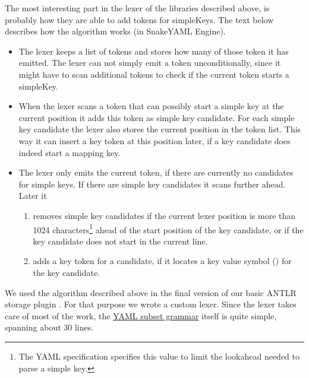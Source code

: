 The most interesting part in the lexer of the libraries described above, is probably how they are able to add \glspl{token} for \glspl{simpleKey}. The text below describes how the algorithm works (in SnakeYAML Engine).

\begin{itemize}

  \item The lexer keeps a list of \glspl{token} and stores how many of those \gls{token} it has emitted. The lexer can not simply emit a \gls{token} unconditionally, since it might have to scan additional \glspl{token} to check if the current \gls{token} starts a \gls{simpleKey}.

  \item When the lexer scans a  \gls{token} that can possibly start a simple key at the current position it adds this \gls{token} as simple key candidate. For each simple key candidate the lexer also stores the current position in the \gls{token} list. This way it can insert a key \gls{token} at this position later, if a key candidate does indeed start a mapping key.

  \item The lexer only emits the current \gls{token}, if there are currently no candidates for simple keys. If there are simple key candidates it scans further ahead. Later it

  \begin{enumerate}
    \item removes simple key candidates if the current lexer position is more than 1024 characters\footnote{The YAML specification specifies this value to limit the lookahead needed to parse a simple key.} ahead of the start position of the key candidate, or if the key candidate does not start in the current line.

    \item adds a key \gls{token} for a candidate, if it locates a key value symbol (\yaml{:}) for the key candidate.
  \end{enumerate}

\end{itemize}

We used the algorithm described above in the final version of our basic \gls{ANTLR} storage plugin \LinkYanLR{}. For that purpose we wrote a custom  lexer. Since the lexer takes care of most of the work, the \href{https://github.com/ElektraInitiative/libelektra/blob/48ccea7107584b1aa28f19ab2b65c9b30090f124/src/plugins/yanlr/YAML.g4}{YAML subset grammar} itself is quite simple, spanning about 30 lines.

